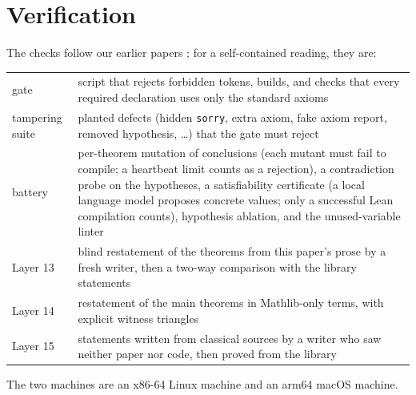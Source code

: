 \documentclass[11pt]{article}
\theoremstyle{definition}
\theoremstyle{remark}
\newcommand{\lean}[1]{\texttt{#1}}
\begin{document}
\section{Verification}\label{sec:verify}
The checks follow our earlier papers \cite{paperA,paperF}; for a self-contained reading, they are:
\begin{center}\small
\begin{tabular}{@{}l p{11.2cm}@{}}
\toprule
gate & script that rejects forbidden tokens, builds, and checks that every required declaration uses only
the standard axioms\\
tampering suite & planted defects (hidden \lean{sorry}, extra axiom, fake axiom report, removed
hypothesis, \ldots) that the gate must reject\\
battery & per-theorem mutation of conclusions (each mutant must fail to compile; a heartbeat limit
counts as a rejection), a contradiction probe on the hypotheses, a satisfiability certificate (a local
language model proposes concrete values; only a successful Lean compilation counts), hypothesis
ablation, and the unused-variable linter\\
Layer 13 & blind restatement of the theorems from this paper's prose by a fresh writer, then a
two-way comparison with the library statements\\
Layer 14 & restatement of the main theorems in Mathlib-only terms, with explicit witness triangles\\
Layer 15 & statements written from classical sources by a writer who saw neither paper nor code, then
proved from the library\\
\bottomrule
\end{tabular}
\end{center}
The two machines are an x86-64 Linux machine and an arm64 macOS machine.
\end{document}
